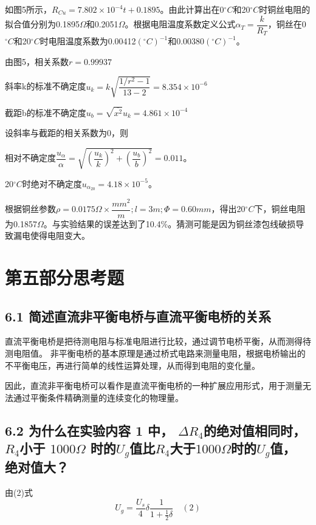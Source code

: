 \documentclass{ctexart}
\begin{document}
        如图5所示，$R_{Cu}=7.802\times 10^{-4}t+0.1895$。由此计算出在0$^\circ C$和20$^\circ C$时铜丝电阻的拟合值分别为0.1895$\Omega$和0.2051$\Omega$。根据电阻温度系数定义公式$\alpha_T=\dfrac{k}{R_T}$，铜丝在0$^\circ C$和20$^\circ C$时电阻温度系数为0.00412$(^\circ C)^{-1}$和0.00380$(^\circ C)^{-1}$。
        
        由图5，相关系数$r=0.99937$

        斜率k的标准不确定度$u_k=k\sqrt{\dfrac{1/r^2-1}{13-2}}=8.354\times 10^{-6}$
        
        截距b的标准不确定度$u_b=\sqrt{\overline{x^2} }u_k=4.861\times 10^{-4}$

        设斜率与截距的相关系数为0，则

        相对不确定度$\dfrac{u_{\alpha}}{\alpha}=\sqrt{(\dfrac{u_k}{k})^2+(\dfrac{u_b}{b})^2}=0.011$。

        20$^\circ C$时绝对不确定度$u_{\alpha_{20}}=4.18\times 10^{-5}$。

        根据铜丝参数$\rho=0.0175\Omega\times\dfrac{mm^2}{m};l=3m;\Phi=0.60mm$，得出20$^\circ C$下，铜丝电阻为0.1857$\Omega$。与实验结果的误差达到了10.4\%。猜测可能是因为铜丝漆包线破损导致漏电使得电阻变大。


        
        \section*{第五部分\quad 思考题}
        \subsection*{6.1 简述直流非平衡电桥与直流平衡电桥的关系}
        直流平衡电桥是把待测电阻与标准电阻进行比较，通过调节电桥平衡，从而测得待测电阻值。 非平衡电桥的基本原理是通过桥式电路来测量电阻，根据电桥输出的不平衡电压，再进行简单的线性运算处理，从而得到电阻的变化量。

        因此，直流非平衡电桥可以看作是直流平衡电桥的一种扩展应用形式，用于测量无法通过平衡条件精确测量的连续变化的物理量。

        \subsection*{6.2 为什么在实验内容 1 中， $\Delta R_4$的绝对值相同时，$R_4$小于 $1000\Omega$ 时的$U_g$值比$R_4$大于$1000\Omega$时的$U_g$值， 绝对值大？}
        由(2)式
        $$U_g=\dfrac{U_s}{4} \delta \dfrac{1}{1+\frac{1}{2}\delta}\quad (2)$$
\end{document}
